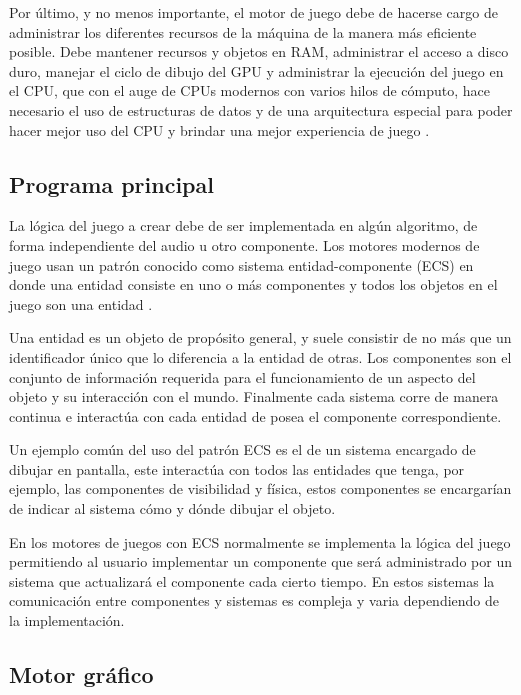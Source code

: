 Por último, y no menos importante, el motor de juego debe de hacerse cargo de administrar los diferentes recursos de la máquina de la manera más eficiente posible. Debe mantener recursos y objetos en RAM, administrar el acceso a disco duro, manejar el ciclo de dibujo del GPU y administrar la ejecución del juego en el CPU, que con el auge de CPUs modernos con varios hilos de cómputo, hace necesario el uso de estructuras de datos y de una arquitectura especial para poder hacer mejor uso del CPU y brindar una mejor experiencia de juego \cite{andrews2009designing}.

\subsection{Programa principal} \label{sec:MTlogica}

La lógica del juego a crear debe de ser implementada en algún algoritmo, de forma independiente del audio u otro componente. Los motores modernos de juego usan un patrón conocido como sistema entidad-componente (ECS) en donde una entidad consiste en uno o más componentes y todos los objetos en el juego son una entidad \cite{JasonGregory-GameEngineArchitecture}.

Una entidad es un objeto de propósito general, y suele consistir de no más que un identificador único que lo diferencia a la entidad de otras. Los componentes son el conjunto de información requerida para el funcionamiento de un aspecto del objeto y su interacción con el mundo. Finalmente cada sistema corre de manera continua e interactúa con cada entidad de posea el componente correspondiente.

Un ejemplo común del uso del patrón ECS es el de un sistema encargado de dibujar en pantalla, este interactúa con todos las entidades que tenga, por ejemplo, las componentes de visibilidad y física, estos componentes se encargarían de indicar al sistema cómo y dónde dibujar el objeto.

En los motores de juegos con ECS normalmente se implementa la lógica del juego permitiendo al usuario implementar un componente que será administrado por un sistema que actualizará el componente cada cierto tiempo. En estos sistemas la comunicación entre componentes y sistemas es compleja y varia dependiendo de la implementación.

\subsection{Motor gráfico}

